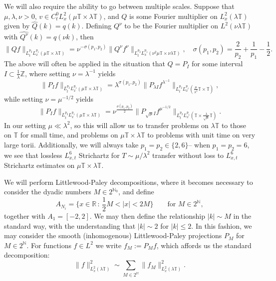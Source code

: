 \documentclass[12pt, letterpaper]{amsart}
\begin{document}
We will also require the ability to go between multiple scales. Suppose that $\mu, \lambda, \nu > 0$, $v\in C^0_tL^2_x(\mu\mathbb{T}\times\lambda\mathbb{T})$, and $Q$ is some Fourier multiplier on $L^2_x(\lambda\mathbb{T})$ given by $\widehat{Q}(k) = q(k)$. Defining $Q^\nu$ to be the Fourier multiplier on $L^2(\nu\lambda\mathbb{T})$ with $\widehat{Q^\nu}(k) = q(\nu k)$, then
\begin{equation}\label{Equation: Scaling Multiplier}
\|Qf\|_{L^{p_2}_tL^{p_1}_x(\mu\mathbb{T}\times \lambda\mathbb{T})} = \nu^{-\sigma(p_1,p_2)}\|Q^{\nu}f^{\nu}\|_{L^{p_2}_tL^{p_1}_x(\nu^2\mu\mathbb{T}\times \nu\lambda\mathbb{T})}, \quad \sigma(p_1, p_2) = \frac{2}{p_2}+\frac{1}{p_1} - \frac12.
\end{equation}
The above will often be applied in the situation that $Q = P_I$ for some interval $I\subset \tfrac{1}{\lambda}\mathbb{Z}$, where setting $\nu = \lambda^{-1}$ yields
\[
\|P_If\|_{L^{p_2}_tL^{p_1}_x(\mu\mathbb{T}\times \lambda\mathbb{T})} = \lambda^{\sigma(p_1,p_2)}\|P_{\lambda I}f^{\lambda^{-1}}\|_{L^{p_2}_tL^{p_1}_x(\tfrac{\mu}{\lambda^2}\mathbb{T}\times\mathbb{T})},
\]
while setting $\nu = \mu^{-1/2}$ yields
\[
    \|P_If\|_{L^{p_2}_tL^{p_1}_x(\mu\mathbb{T}\times \lambda\mathbb{T})} = \nu^{\frac{\sigma(p_1,p_2)}{2}}\|P_{\sqrt{\mu} I}f^{\mu^{-1/2}}\|_{L^{p_2}_tL^{p_1}_x(\mathbb{T}\times\tfrac{\lambda}{\sqrt{\mu}}\mathbb{T})}.
\]
In our setting $\mu \ll \lambda^2$, so this will allow us to transfer problems on $\lambda\mathbb{T}$ to those on $\mathbb{T}$ for small time, and problems on $\mu\mathbb{T}\times\lambda\mathbb{T}$ to problems with unit time on very large torii. Additionally, we will always take $p_1=p_2\in\{2, 6\}$-- when $p_1 = p_2 = 6$, we see that lossless $L^6_{x,t}$ Strichartz for $T \sim \mu/\lambda^2$ transfer without loss to $L^6_{x,t}$ Strichartz estimates on $\mu\mathbb{T}\times \lambda\mathbb{T}$.

We will perform Littlewood-Paley decompositions, where it becomes necessary to consider the dyadic numbers $M\in 2^{\mathbb{N}_0}$, and define
\[
A_{N_i} = \{x\in\mathbb{R}\,:\,\frac{1}{2}M<|x| < 2M\}\qquad\mbox{for }M\in 2^\mathbb{N},
\]
together with $A_1 = [-2,2]$. We may then define the relationship $|k|\sim M$ in the standard way, with the understanding that $|k|\sim 2$ for $|k|\leq 2$. In this fashion, we may consider the smooth (inhomogenous) Littlewood-Paley projections $P_M$ for $M\in 2^\mathbb{N}$. For functions $f\in L^2$ we write $f_{M} := P_M f$, which affords us the standard decomposition:
\[
\|f\|_{L^2_x(\lambda\mathbb{T})}^2\sim \sum_{M\in2^\mathbb{M}}\|f_M\|_{L^2_x(\lambda\mathbb{T})}^2.
\]
\end{document}
